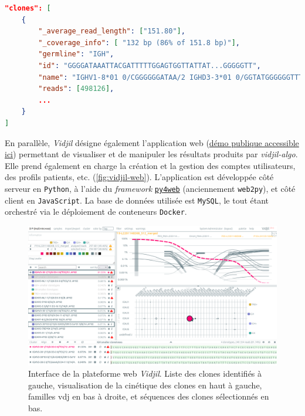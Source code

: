 \begin{lstlisting}[language=json, 
caption={Extrait d'une sortie de \textit{vidjil-algo}.},
label={lst:json-vidjil}]
"clones": [
    {
        "_average_read_length": ["151.80"],
        "_coverage_info": [ "132 bp (86% of 151.8 bp)"],
        "germline": "IGH",
        "id": "GGGGATAAATTACGATTTTTGGAGTGGTTATTAT...GGGGGTT",
        "name": "IGHV1-8*01 0/CGGGGGGATAA/2 IGHD3-3*01 0/GGTATGGGGGGTTTTAG/7 IGHJ4*02",
        "reads": [498126],
        ...
    }
]
\end{lstlisting}

\vspace{1em}

En parallèle, \textit{Vidjil} désigne également l'application web (\href{https://app.vidjil.org/}{démo publique accessible ici}) 
permettant de visualiser et de manipuler les résultats produits par \textit{vidjil-algo}. 
Elle prend également en charge la création et la gestion des comptes utilisateurs, des profils patients, etc. (\autoref{fig:vidjil-web}). 
L'application est développée côté serveur en \texttt{Python}, à l'aide du \textit{framework} \href{https://py4web.com}{\texttt{py4web}} 
(anciennement \texttt{web2py}), et côté client en \texttt{JavaScript}. La base de données utilisée est \texttt{MySQL}, 
le tout étant orchestré via le déploiement de conteneurs \texttt{Docker}.

\begin{figure}[H]
    \centering
    \includegraphics[width=1\textwidth]{images/vidjil-web.png}
    \caption{Interface de la plateforme web \textit{Vidjil}. 
    Liste des clones identifiés à gauche, visualisation de la cinétique des clones en haut à gauche, 
    familles \gls{vdj} en bas à droite, et séquences des clones sélectionnés en bas.}
    \label{fig:vidjil-web}
\end{figure}

